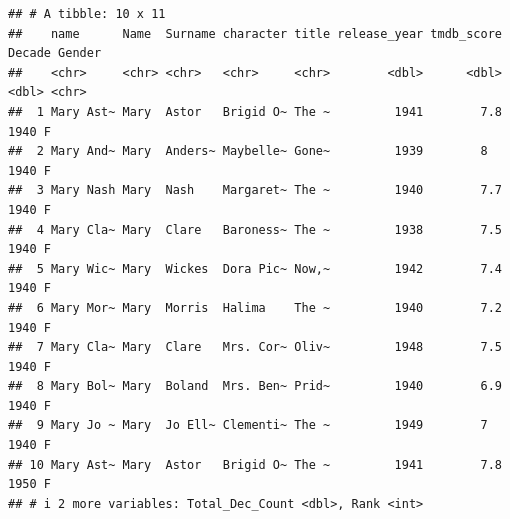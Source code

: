 \documentclass[11pt,preprint]{elsarticle}
\numberwithin{equation}{section}
\numberwithin{figure}{section}
\numberwithin{table}{section}
\begin{document}
\begin{verbatim}
## # A tibble: 10 x 11
##    name      Name  Surname character title release_year tmdb_score Decade Gender
##    <chr>     <chr> <chr>   <chr>     <chr>        <dbl>      <dbl>  <dbl> <chr> 
##  1 Mary Ast~ Mary  Astor   Brigid O~ The ~         1941        7.8   1940 F     
##  2 Mary And~ Mary  Anders~ Maybelle~ Gone~         1939        8     1940 F     
##  3 Mary Nash Mary  Nash    Margaret~ The ~         1940        7.7   1940 F     
##  4 Mary Cla~ Mary  Clare   Baroness~ The ~         1938        7.5   1940 F     
##  5 Mary Wic~ Mary  Wickes  Dora Pic~ Now,~         1942        7.4   1940 F     
##  6 Mary Mor~ Mary  Morris  Halima    The ~         1940        7.2   1940 F     
##  7 Mary Cla~ Mary  Clare   Mrs. Cor~ Oliv~         1948        7.5   1940 F     
##  8 Mary Bol~ Mary  Boland  Mrs. Ben~ Prid~         1940        6.9   1940 F     
##  9 Mary Jo ~ Mary  Jo Ell~ Clementi~ The ~         1949        7     1940 F     
## 10 Mary Ast~ Mary  Astor   Brigid O~ The ~         1941        7.8   1950 F     
## # i 2 more variables: Total_Dec_Count <dbl>, Rank <int>
\end{verbatim}


\end{document}
